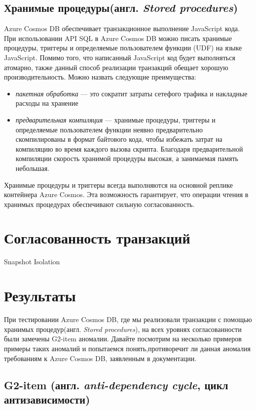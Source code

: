 \documentclass[12pt,  openany]{book}
\begin{document}
\subsection{Хранимые процедуры(англ. \textit{Stored procedures})}
Azure Cosmos DB обеспечивает транзакционное выполнение JavaScript кода. При использовании API SQL в Azure Cosmos DB можно писать хранимые процедуры, триггеры и определяемые пользователем функции (UDF) на языке JavaScript.
Помимо того, что написанный JavaScript код будет выполняться атомарно, также данный  способ реализации транзакций обещает хорошую производительность. Можно назвать следующие преимущества:
\begin{itemize}
\item \textit{пакетная обработка} --- это сократит затраты сетефого трафика и накладные расходы на хранение
\item  \textit{предварительная компиляция} --- хранимые процедуры, триггеры и определяемые пользователем функции неявно предварительно скомпилированы в формат байтового кода, чтобы избежать затрат на компиляцию во время каждого вызова скрипта. Благодаря предварительной компиляции скорость хранимой процедуры высокая, а занимаемая память небольшая.
\end{itemize}
\par
Хранимые процедуры и триггеры всегда выполняются на основной реплике контейнера Azure Cosmos. Эта возможность гарантирует, что операции чтения в хранимых процедурах обеспечивают сильную согласованность. 

\section{Согласованность транзакций}
Snapshot Isolation

\section{Результаты}
При тестировании Azure Cosmos DB, где мы реализовали транзакции с помощью хранимых процедур(англ. \textit{Stored procedures}), на всех уровнях согласованности были замечены G2-item  аномалии. Давайте посмотрим на несколько примеров примеры таких аномалий и попытаемся понять,противоречит ли данная аномалия требованиям к Azure Cosmos DB, заявленным в документации.
\subsection{G2-item (англ. \textit{anti-dependency cycle}, цикл антизависимости)}
\end{document}
